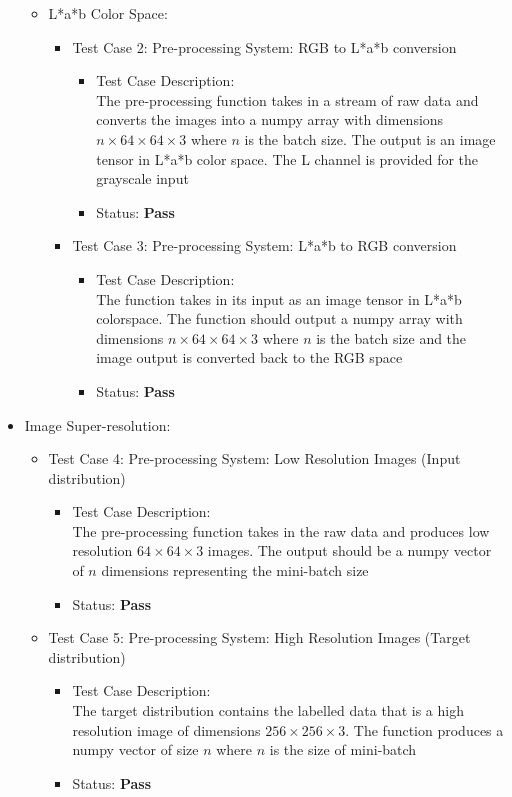 \documentclass[oneside,a4paper,12pt]{report}
\begin{document}
\begin{itemize}
\begin{itemize}
\begin{itemize}
\begin{itemize}
	\end{itemize}
	\end{itemize}
	\item L*a*b Color Space:
	\begin{itemize}
		\item Test Case 2: Pre-processing System: RGB to L*a*b conversion
	\begin{itemize}
		\item Test Case Description:\\
			The pre-processing function takes in a stream of raw data and converts the images into a numpy array with dimensions $n \times 64 \times 64 \times 3$ where $n$ is the batch size. The output is an image tensor in L*a*b color space. The L channel is provided for the grayscale input 
		\item Status: \textbf{Pass}
	\end{itemize}
		\item Test Case 3: Pre-processing System: L*a*b to RGB conversion
	\begin{itemize}
		\item Test Case Description:\\
			The function takes in its input as an image tensor in L*a*b colorspace. The function should output a numpy array with dimensions $n \times 64 \times 64 \times 3$ where $n$ is the batch size and the image output is converted back to the RGB space
		\item Status: \textbf{Pass}

	\end{itemize}
	\end{itemize}
	\end{itemize}
	\item Image Super-resolution:
	\begin{itemize}
		\item Test Case 4: Pre-processing System: Low Resolution Images (Input distribution)
		\begin{itemize}
			\item Test Case Description:\\
			The pre-processing function takes in the raw data and produces low resolution $64 \times 64 \times 3$ images. The output should be a numpy vector of $n$ dimensions representing the mini-batch size
			\item Status: \textbf{Pass}
		\end{itemize}
		\item Test Case 5: Pre-processing System: High Resolution Images (Target distribution)
		\begin{itemize}
			\item Test Case Description:\\
			The target distribution contains the labelled data that is a high resolution image of dimensions $256 \times 256 \times 3$. The function produces a numpy vector of size $n$ where $n$ is the size of mini-batch
			\item Status: \textbf{Pass}
		\end{itemize}
	\end{itemize}
\end{itemize}
\end{document}
